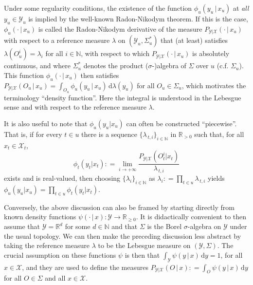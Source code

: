 \documentclass[3p]{elsarticle}
\newcommand{\nats}{\mathbb{N}}
\newcommand{\reals}{\mathbb{R}}
\newcommand{\realspos}{\reals_{>0}}
\newcommand{\realsnonneg}{\reals_{\geq 0}}
\newcommand{\states}{\mathcal{X}}
\newcommand{\observs}{\mathcal{Y}}
\newcommand{\coloneqq}{:\!=}
\begin{document}
Under some regularity conditions, the existence of the function $\phi_u(y_u\,\vert\,x_u)$ at \emph{all} $y_u\in\observs_u$ is implied by the well-known Radon-Nikodym theorem. If this is the case, $\phi_u(\cdot\,\vert\,x_u)$ is called the Radon-Nikodym derivative of the measure $P_{\observs\vert\states}(\cdot\,\vert\,x_u)$ with respect to a reference measure $\lambda$ on $(\observs_u,\Sigma_u^*)$ that (at least) satisfies $\lambda(O_u^i)=\lambda_i$ for all $i\in\nats$, with respect to which $P_{\observs\vert\states}(\cdot\,\vert\,x_u)$ is absolutely continuous, and where $\Sigma_u^*$ denotes the product ($\sigma$-)algebra of $\Sigma$ over $u$ (c.f. $\Sigma_u$). This function $\phi_u(\cdot\,\vert\,x_u)$ then satisfies $P_{\observs\vert\states}(O_u\,\vert\,x_u)=\int_{O_u}\phi_u(y_u\,\vert\,x_u)\,\mathrm{d}\lambda(y_u)$ for all $O_u\in\Sigma_u$, which motivates the terminology ``density function''. Here the integral is understood in the Lebesgue sense and with respect to the reference measure $\lambda$.

It is also useful to note that $\phi_u(y_u\vert x_u)$ can often be constructed ``piecewise''. That is, if for every $t\in u$ there is a sequence $\{\lambda_{\,t,i}\}_{i\in\nats}$ in $\realspos$ such that, for all $x_t\in\states_t$,
\begin{equation*}
\phi_t(y_t\vert x_t)\coloneqq \lim_{i\to+\infty} \frac{P_{\observs\vert\states}(O_t^i\vert x_t)}{\lambda_{\,t,i}}
\end{equation*}
exists and is real-valued, then choosing $\{\lambda_i\}_{i\in\nats}$ as $\lambda_i\coloneqq \prod_{t\in u}\lambda_{\,t,i}$ yields $\phi_u(y_u\vert x_u)=\prod_{t\in u}\phi_t(y_t\vert x_t)$. 

Conversely, the above discussion can also be framed by starting directly from known density functions $\psi(\cdot\,\vert\,x):\observs\to\realsnonneg$. It is didactically convenient to then assume that $\observs=\reals^d$ for some $d\in\nats$ and that $\Sigma$ is the Borel $\sigma$-algebra on $\observs$ under the usual topology. We can then make the preceding discussion less abstract by taking the reference measure $\lambda$ to be the Lebesgue measure on $(\observs,\Sigma)$. The crucial assumption on these functions $\psi$ is then that $\int_\observs \psi(y\,\vert\,x)\,\mathrm{d}y=1$, for all $x\in\states$, and they are used to define the measures $P_{\observs\vert\states}(O\,\vert\,x)\coloneqq \int_O\psi(y\,\vert\,x)\,\mathrm{d}y$ for all $O\in\Sigma$ and all $x\in\states$.
\end{document}
